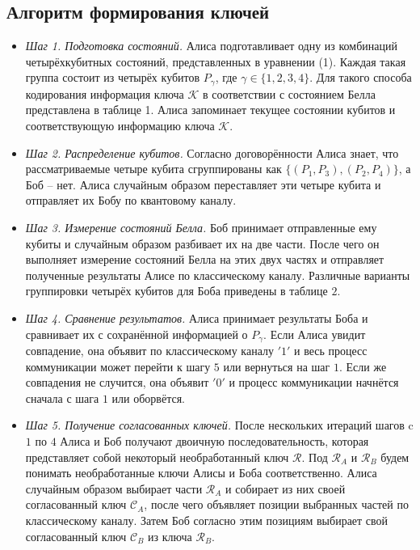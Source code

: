 \documentclass[a4paper,11pt]{article}
\begin{document}
\subsection{Алгоритм формирования ключей}

\begin{itemize}

\item \textit{Шаг 1. Подготовка состояний.} Алиса подготавливает одну из комбинаций четырёхкубитных состояний, представленных в уравнении (1). Каждая такая группа состоит из четырёх кубитов $P_\gamma$, где $\gamma \in \{1,2,3,4\}$. Для такого способа кодирования информация ключа $\mathcal{K}$ в соответствии с состоянием Белла представлена в таблице 1. Алиса запоминает текущее состоянии кубитов и соответствующую информацию ключа $\mathcal{K}$.

\item \textit{Шаг 2. Распределение кубитов.} Согласно договорённости Алиса знает, что рассматриваемые четыре кубита сгруппированы как $\{(P_1, P_3), (P_2, P_4)\}$, а Боб -- нет. Алиса случайным образом переставляет эти четыре кубита и отправляет их Бобу по квантовому каналу.

\item \textit{Шаг 3. Измерение состояний Белла.} Боб принимает отправленные ему кубиты и случайным образом разбивает их на две части. После чего он выполняет измерение состояний Белла на этих двух частях и отправляет полученные результаты Алисе по классическому каналу. Различные варианты группировки четырёх кубитов для Боба приведены в таблице $2$.

\item \textit{Шаг 4. Сравнение результатов.} Алиса принимает результаты Боба и сравнивает их с сохранённой информацией о $P_\gamma$. Если Алиса увидит совпадение, она объявит по классическому каналу $'1'$ и весь процесс коммуникации может перейти к шагу $5$ или вернуться на шаг $1$. Если же совпадения не случится, она объявит $'0'$ и процесс коммуникации начнётся сначала с шага $1$ или оборвётся. 

\item \textit{Шаг 5. Получение согласованных ключей.} После нескольких итераций шагов c $1$ по $4$ Алиса и Боб получают двоичную последовательность, которая представляет собой некоторый необработанный ключ $\mathcal{R}$. Под $\mathcal{R}_A$ и $\mathcal{R}_B$ будем понимать необработанные ключи Алисы и Боба соответственно. Алиса случайным образом выбирает части $\mathcal{R}_A$ и собирает из них своей согласованный ключ $\mathcal{C}_A$, после чего объявляет позиции выбранных частей по классическому каналу. Затем Боб согласно этим позициям выбирает свой согласованный ключ $\mathcal{C}_B$ из ключа $\mathcal{R}_B$.


\end{itemize}
\end{document}
